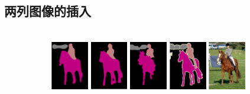\subsection{两列图像的插入}
\label{sec:complex}

\begin{figure}[h!] %
	\begin{subfigure}{0.55\textwidth}
		 \\
		\includegraphics[width=0.18\textwidth]{image/result/compare/my_horse.pdf}
		\includegraphics[width=0.18\textwidth]{image/result/compare/fcn_horse.png}
		\includegraphics[width=0.18\textwidth]{image/result/compare/sds_horse.png}
		\includegraphics[width=0.18\textwidth]{image/result/compare/gt_horse.pdf}
		\includegraphics[width=0.18\textwidth]{image/result/compare/im_horse.pdf}

\end{subfigure}
\end{figure}
